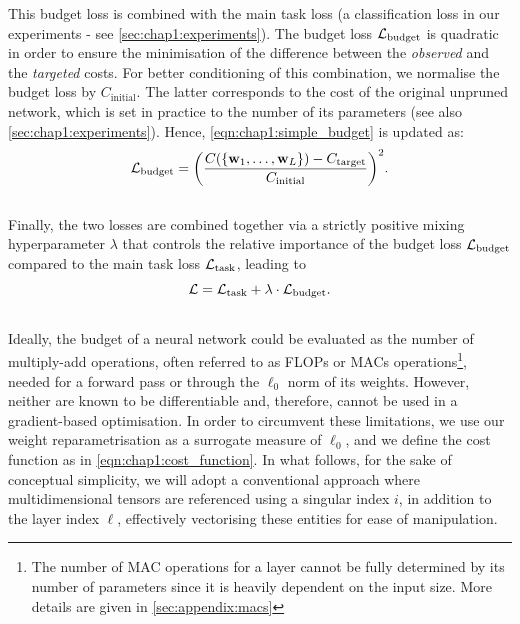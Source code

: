 \noindent This budget loss is combined with the main task loss (a classification
loss in our experiments - see \cref{sec:chap1:experiments}). The budget loss $
{\cal L}_\text{budget}$ is quadratic in order to ensure the minimisation of the
difference between the {\em observed} and the {\em targeted} costs. For better
conditioning of this combination, we normalise the budget loss by
$C_\text{initial}$. The latter corresponds to the cost of the original unpruned
network, which is set in practice to the number of its parameters (see also
\cref{sec:chap1:experiments}). Hence, \cref{eqn:chap1:simple_budget} is updated
as:\\

\begin{equation}
  \label{eqn:chap1:real_budget}
  {\cal L}_\text{budget} = \biggl( \displaystyle\frac{C(\{\mathbf{w}_1,\dots, \mathbf{w}_L\}) - C_\text{target}}{C_\text{initial}} \biggr)^2.
\end{equation}\\

Finally, the two losses are combined together via a strictly positive mixing
hyperparameter $\lambda$ that controls the relative importance of the budget loss
${\cal L}_\text{budget}$ compared to the main task loss ${\cal L}_\text{task}$,
leading to\\

\begin{equation}
  \label{eqn:chap1:globalloss}
   {\cal L} =  {\cal L}_\text{task} + \lambda \cdot {\cal L}_\text{budget}.
\end{equation} \\

Ideally, the budget of a neural network could be evaluated as the number of
multiply-add operations, often referred to as \acp{FLOP} or \acp{MAC}
operations\footnote{The number of \ac{MAC} operations for a layer cannot be
fully determined by its number of parameters since it is heavily dependent on
the input size. More details are given in \cref{sec:appendix:macs}}, needed for
a forward pass or through the $\ell_0$ norm of its weights. However, neither are
known to be differentiable and, therefore, cannot be used in a gradient-based
optimisation. In order to circumvent these limitations, we use our weight
reparametrisation as a surrogate measure of $\ell_0$, and we define the cost
function as in \cref{eqn:chap1:cost_function}. In what follows, for the sake of
conceptual simplicity, we will adopt a conventional approach where
multidimensional tensors are referenced using a singular index $i$, in addition
to the layer index $\ell$, effectively vectorising these entities for ease of
manipulation. \\

